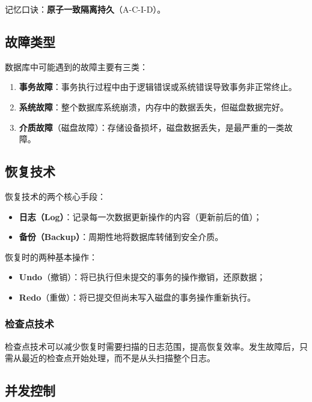 \documentclass{../../note}
\begin{document}
记忆口诀：\textbf{原子一致隔离持久}（A-C-I-D）。

\subsection{故障类型}

数据库中可能遇到的故障主要有三类：

\begin{enumerate}
  \item \textbf{事务故障}：事务执行过程中由于逻辑错误或系统错误导致事务非正常终止。
  \item \textbf{系统故障}：整个数据库系统崩溃，内存中的数据丢失，但磁盘数据完好。
  \item \textbf{介质故障}（磁盘故障）：存储设备损坏，磁盘数据丢失，是最严重的一类故障。
\end{enumerate}

\subsection{恢复技术}

恢复技术的两个核心手段：

\begin{itemize}
  \item \textbf{日志（Log）}：记录每一次数据更新操作的内容（更新前后的值）；
  \item \textbf{备份（Backup）}：周期性地将数据库转储到安全介质。
\end{itemize}

恢复时的两种基本操作：

\begin{itemize}
  \item \textbf{Undo}（撤销）：将已执行但未提交的事务的操作撤销，还原数据；
  \item \textbf{Redo}（重做）：将已提交但尚未写入磁盘的事务操作重新执行。
\end{itemize}

\subsubsection{检查点技术}

检查点技术可以减少恢复时需要扫描的日志范围，提高恢复效率。发生故障后，只需从最近的检查点开始处理，而不是从头扫描整个日志。

\subsection{并发控制}
\end{document}
